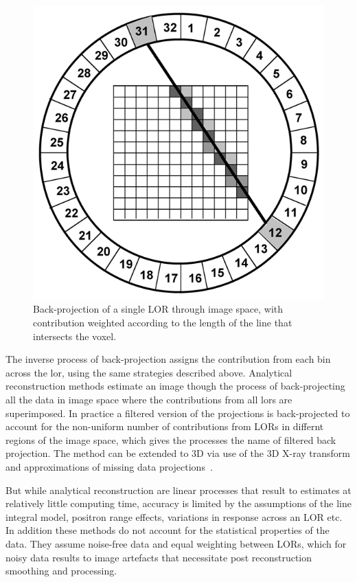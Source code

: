 \begin{figure} [h!]
\centering
\includegraphics[scale=0.35,angle=0]{2_Theory_Methods/figures/Radon_Discrete.png}
\caption{Back-projection of a single LOR through image space, with contribution weighted according to the length of the line that intersects the voxel.} 
\label{fig_3:back_projection.}
\end{figure} 

The inverse process of back-projection assigns the contribution from each bin across the \gls{lor}, using the same strategies described above. 
Analytical reconstruction methods estimate an image though the process of back-projecting all the data in image space where the contributions from all \glspl{lor} are superimposed. In practice a filtered version of the projections is back-projected to account for the non-uniform number of contributions from LORs in differnt regions of the image space, which gives the processes the name of filtered back projection. The method can be extended to 3D via use of the 3D X-ray transform and approximations of missing data projections~\cite{Kinahan1989}. 

But while analytical reconstruction are linear processes that result to estimates at relatively little computing time, accuracy is limited by the assumptions of the line integral model, positron range effects, variations in response across an LOR etc. In addition these methods do not account for the statistical properties of the data. They assume noise-free data and equal weighting between LORs, which for noisy data results to image artefacts that necessitate post reconstruction smoothing and processing.

